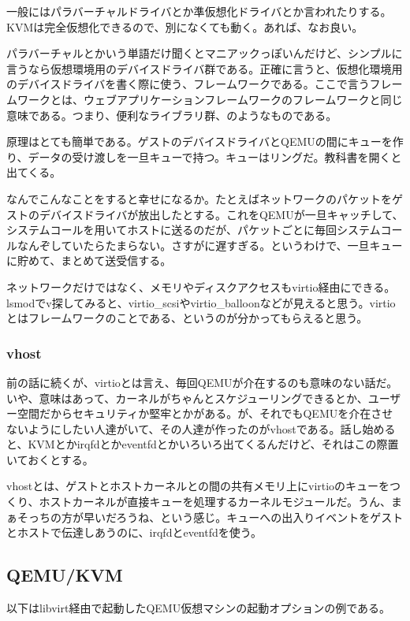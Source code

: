 ﻿\documentclass[9pt,b5paper,tombo,openany]{jsbook}
\begin{document}
一般にはパラバーチャルドライバとか準仮想化ドライバとか言われたりする。KVMは完全仮想化できるので、別になくても動く。あれば、なお良い。

パラバーチャルとかいう単語だけ聞くとマニアックっぽいんだけど、シンプルに言うなら仮想環境用のデバイスドライバ群である。正確に言うと、仮想化環境用のデバイスドライバを書く際に使う、フレームワークである。ここで言うフレームワークとは、ウェブアプリケーションフレームワークのフレームワークと同じ意味である。つまり、便利なライブラリ群、のようなものである。

原理はとても簡単である。ゲストのデバイスドライバとQEMUの間にキューを作り、データの受け渡しを一旦キューで持つ。キューはリングだ。教科書を開くと出てくる。

なんでこんなことをすると幸せになるか。たとえばネットワークのパケットをゲストのデバイスドライバが放出したとする。これをQEMUが一旦キャッチして、システムコールを用いてホストに送るのだが、パケットごとに毎回システムコールなんぞしていたらたまらない。さすがに遅すぎる。というわけで、一旦キューに貯めて、まとめて送受信する。

ネットワークだけではなく、メモリやディスクアクセスもvirtio経由にできる。lsmodでv探してみると、virtio\_scsiやvirtio\_balloonなどが見えると思う。virtioとはフレームワークのことである、というのが分かってもらえると思う。

\subsubsection{vhost}

前の話に続くが、virtioとは言え、毎回QEMUが介在するのも意味のない話だ。いや、意味はあって、カーネルがちゃんとスケジューリングできるとか、ユーザー空間だからセキュリティか堅牢とかがある。が、それでもQEMUを介在させないようにしたい人達がいて、その人達が作ったのがvhostである。話し始めると、KVMとかirqfdとかeventfdとかいろいろ出てくるんだけど、それはこの際置いておくとする。

vhostとは、ゲストとホストカーネルとの間の共有メモリ上にvirtioのキューをつくり、ホストカーネルが直接キューを処理するカーネルモジュールだ。うん、まぁそっちの方が早いだろうね、という感じ。キューへの出入りイベントをゲストとホストで伝達しあうのに、irqfdとeventfdを使う。

\subsection{QEMU/KVM}

以下はlibvirt経由で起動したQEMU仮想マシンの起動オプションの例である。
\end{document}

